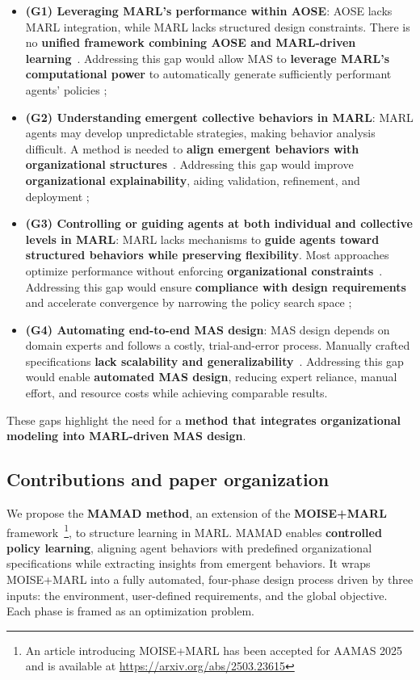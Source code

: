 \documentclass[pdflatex,sn-mathphys-num]{sn-jnl}%
\theoremstyle{thmstyleone}%
\theoremstyle{thmstyletwo}%
\theoremstyle{thmstylethree}%
\begin{document}
\begin{itemize}
    \item \textbf{(G1) Leveraging MARL's performance within AOSE}: AOSE lacks MARL integration, while MARL lacks structured design constraints. There is no \textbf{unified framework combining AOSE and MARL-driven learning}~\cite{Cossentino2014}. Addressing this gap would allow MAS to \textbf{leverage MARL's computational power} to automatically generate sufficiently performant agents' policies ;
          
    \item \textbf{(G2) Understanding emergent collective behaviors in MARL}: MARL agents may develop unpredictable strategies, making behavior analysis difficult. A method is needed to \textbf{align emergent behaviors with organizational structures}~\cite{Du2022, Papoudakis2021}. Addressing this gap would improve \textbf{organizational explainability}, aiding validation, refinement, and deployment ;
          
    \item \textbf{(G3) Controlling or guiding agents at both individual and collective levels in MARL}: MARL lacks mechanisms to \textbf{guide agents toward structured behaviors while preserving flexibility}. Most approaches optimize performance without enforcing \textbf{organizational constraints}~\cite{Oroojlooy2023}. Addressing this gap would ensure \textbf{compliance with design requirements} and accelerate convergence by narrowing the policy search space ;
          
    \item \textbf{(G4) Automating end-to-end MAS design}: MAS design depends on domain experts and follows a costly, trial-and-error process. Manually crafted specifications \textbf{lack scalability and generalizability}~\cite{Nguyen2020}. Addressing this gap would enable \textbf{automated MAS design}, reducing expert reliance, manual effort, and resource costs while achieving comparable results.
\end{itemize}
%
These gaps highlight the need for a \textbf{method that integrates organizational modeling into MARL-driven MAS design}.

\subsection{Contributions and paper organization}

We propose the \textbf{MAMAD method}, an extension of the \textbf{MOISE+MARL} framework~\cite{soule2025moisemarl}\footnote{An article introducing MOISE+MARL has been accepted for AAMAS 2025 and is available at \url{https://arxiv.org/abs/2503.23615}}, to structure learning in MARL. MAMAD enables \textbf{controlled policy learning}, aligning agent behaviors with predefined organizational specifications while extracting insights from emergent behaviors. It wraps MOISE+MARL into a fully automated, four-phase design process driven by three inputs: the environment, user-defined requirements, and the global objective. Each phase is framed as an optimization problem.
\end{document}
